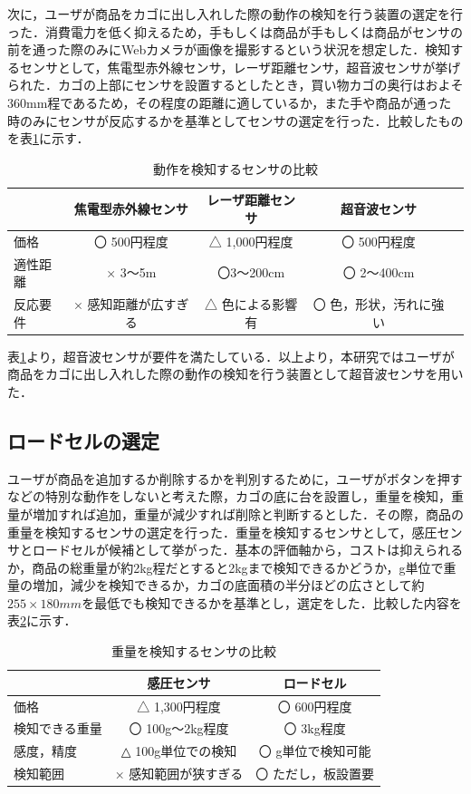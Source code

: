 次に，ユーザが商品をカゴに出し入れした際の動作の検知を行う装置の選定を行った．消費電力を低く抑えるため，手もしくは商品が手もしくは商品がセンサの前を通った際のみにWebカメラが画像を撮影するという状況を想定した．検知するセンサとして，焦電型赤外線センサ，レーザ距離センサ，超音波センサが挙げられた．カゴの上部にセンサを設置するとしたとき，買い物カゴの奥行はおよそ360mm程であるため，その程度の距離に適しているか，また手や商品が通った時のみにセンサが反応するかを基準としてセンサの選定を行った．比較したものを表\ref{kyori}に示す．


\begin{table}[htb]
\begin{center}
\caption{動作を検知するセンサの比較}
\begin{tabular}{|l|c|c|c|c|} \hline
 & 焦電型赤外線センサ & レーザ距離センサ & 超音波センサ \\ \hline \hline
価格 & 〇 500円程度 & △ 1,000円程度 & 〇 500円程度 \\
適性距離 & × 3～5m & 〇3～200cm & 〇 2～400cm \\ 
反応要件 & × 感知距離が広すぎる & △ 色による影響有 & 〇 色，形状，汚れに強い \\ \hline
\end{tabular}
\label{kyori}
\end{center}
\end{table}

表\ref{kyori}より，超音波センサが要件を満たしている．以上より，本研究ではユーザが商品をカゴに出し入れした際の動作の検知を行う装置として超音波センサを用いた．


\subsection{ロードセルの選定}

ユーザが商品を追加するか削除するかを判別するために，ユーザがボタンを押すなどの特別な動作をしないと考えた際，カゴの底に台を設置し，重量を検知，重量が増加すれば追加，重量が減少すれば削除と判断するとした．その際，商品の重量を検知するセンサの選定を行った．重量を検知するセンサとして，感圧センサとロードセルが候補として挙がった．基本の評価軸から，コストは抑えられるか，商品の総重量が約2kg程だとすると2kgまで検知できるかどうか，g単位で重量の増加，減少を検知できるか，カゴの底面積の半分ほどの広さとして約$255\times180mm$を最低でも検知できるかを基準とし，選定をした．比較した内容を表\ref{rodo}に示す．


\begin{table}[htb]
\begin{center}
\caption{重量を検知するセンサの比較}
\begin{tabular}{|l|c|c|} \hline
 & 感圧センサ & ロードセル \\ \hline \hline
価格 & △ 1,300円程度 & 〇 600円程度 \\
検知できる重量 & 〇 100g～2kg程度  & 〇 3kg程度 \\ 
感度，精度 & △ 100g単位での検知 & 〇 g単位で検知可能 \\
検知範囲 & × 感知範囲が狭すぎる & 〇 ただし，板設置要 \\ \hline
\end{tabular}
\label{rodo}
\end{center}
\end{table}


